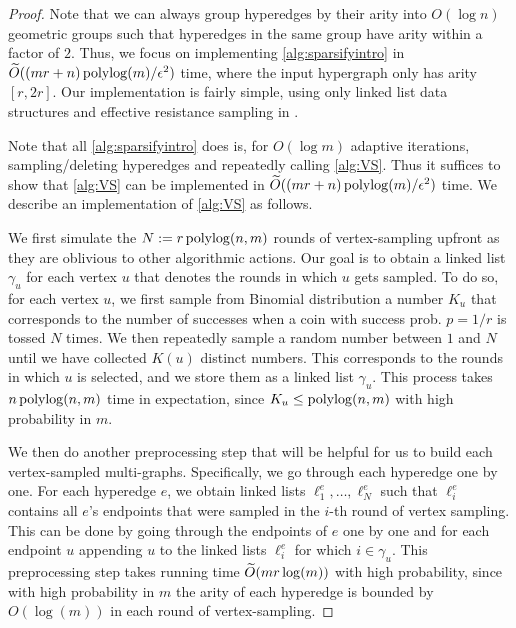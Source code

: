 \documentclass{article}
\begin{document}
\begin{proof}
Note that we can always group hyperedges by their arity into
$O(\log n)$ geometric groups such that hyperedges in the same group have arity within
a factor of $2$.
Thus, we focus on implementing
\cref{alg:sparsifyintro}
in $\widetilde{O}((mr + n)\operatorname{polylog}(m)/\epsilon^2)$ time,
where the input hypergraph only has arity $[r,2r]$.
Our implementation is fairly simple, using only linked list
data structures and effective resistance sampling in \cite{SS11}.

Note that all \cref{alg:sparsifyintro} does
is, for $O(\log m)$ adaptive iterations,
sampling/deleting hyperedges and repeatedly calling \cref{alg:VS}.
Thus it suffices to show that \cref{alg:VS} can be implemented
in $\widetilde{O}((mr+n)\operatorname{polylog}(m) /\epsilon^2)$ time.
We describe an implementation of \cref{alg:VS} as follows.

We first simulate the $N:= r\operatorname{polylog}(n,m)$ rounds of vertex-sampling upfront
as they are oblivious to other algorithmic actions.
Our goal is to obtain a linked list $\gamma_u$ for each vertex $u$ that
denotes the rounds in which $u$ gets sampled.
To do so,
for each vertex $u$, we first sample from Binomial distribution a number $K_u$ that corresponds to the number of successes when a coin with success prob. $p = 1/r$  is tossed $N$ times. We then repeatedly sample a random number between $1$ and $N$ until we have collected $K(u)$ distinct numbers. This corresponds to the rounds in which $u$ is selected, and we store them as a linked list $\gamma_u$.
This process takes $n\operatorname{polylog}(n,m)$ time in expectation, since $K_u \leq \operatorname{polylog}(n,m)$ with high probability in $m$.

We then do another preprocessing step that will be helpful for us to build each vertex-sampled
multi-graphs. Specifically, we go through each hyperedge one by one. For each hyperedge $e$,
we obtain linked lists $\ell_1^e,\ldots, \ell_{N}^e$ such that
$\ell_i^e$ contains all $e$'s endpoints that were sampled in the $i$-th round of vertex sampling.
This can be done by going through the endpoints of $e$ one by one and for each
endpoint $u$ appending $u$ to the linked lists $\ell_i^e$ for which $i\in \gamma_u$.
This preprocessing step takes running time $\widetilde{O}(m r \log(m))$ with high probability,
since with high probability in $m$ the arity of each hyperedge is bounded by $O(\log(m))$
in each round of vertex-sampling.


\end{proof}
\end{document}
